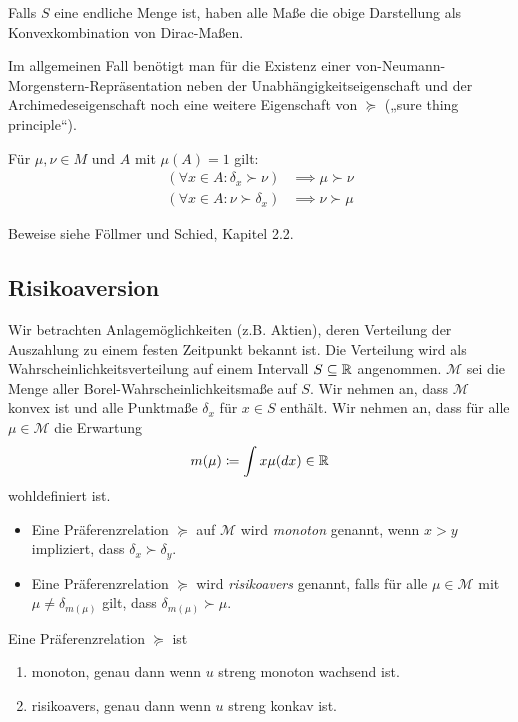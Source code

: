 \documentclass[a4paper,twoside,DIV15,BCOR12mm]{scrbook}
\newcommand{\cM}{\mathcal M}
\begin{document}
Falls $S$ eine endliche Menge ist, haben alle Maße die obige Darstellung als Konvexkombination von Dirac-Maßen.

Im allgemeinen Fall benötigt man für die Existenz einer von-Neu\-mann-Mor\-gen\-stern-Re\-prä\-sen\-tat\-ion neben der Unabhängigkeitseigenschaft und der Archimedeseigenschaft noch eine weitere Eigenschaft von $\succeq$ („sure thing principle“).

Für $\mu,\nu \in M$ und $A$ mit $\mu(A)=1$ gilt:
\begin{align*}
(\forall x\in A:\delta_x\succ \nu) &\implies \mu \succ \nu \\
(\forall x\in A:\nu \succ \delta_x) &\implies \nu \succ \mu
\end{align*}

Beweise siehe Föllmer und Schied, Kapitel 2.2.

\subsection{Risikoaversion}

Wir betrachten Anlagemöglichkeiten (z.B. Aktien), deren Verteilung der Auszahlung zu einem festen Zeitpunkt bekannt ist. Die Verteilung wird als Wahrscheinlichkeitsverteilung auf einem Intervall $S\subseteq \mathbb{R}$ angenommen. $\cM$ sei die Menge aller Borel-Wahrscheinlichkeitsmaße auf $S$. Wir nehmen an, dass $\cM$ konvex ist und alle Punktmaße $\delta_x$ für $x\in S$ enthält. Wir nehmen an, dass für alle $\mu\in\cM$ die Erwartung 
\[
m(\mu) \da \int x \mu (dx) \in \MdR
\]
wohldefiniert ist.

\begin{definition}
\begin{itemize}
\item Eine Präferenzrelation $\succeq$ auf $\cM$ wird \emph{monoton} genannt, wenn $x>y$ impliziert, dass $\delta_x \succ \delta_y$.
\item Eine Präferenzrelation $\succeq$ wird \emph{risikoavers} genannt, falls für alle $\mu\in\cM$ mit $\mu \ne \delta_{m(\mu)}$ gilt, dass $\delta_{m(\mu)} \succ \mu$.
\end{itemize}
\end{definition}

\begin{satz}
Eine Präferenzrelation $\succeq$ ist 
\begin{enumerate}
\item monoton, genau dann wenn $u$ streng monoton wachsend ist.
\item risikoavers, genau dann wenn $u$ streng konkav ist.
\end{enumerate}
\end{satz}
\end{document}
